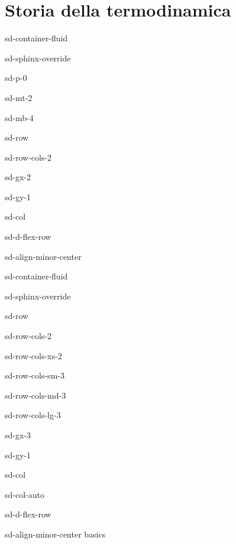 \documentclass[letterpaper,10pt,english]{jupyterBook}
\begin{document}
\chapter{Storia della termodinamica}
\label{\detokenize{ch/history:storia-della-termodinamica}}\label{\detokenize{ch/history:classical-thermodynamics-history}}\label{\detokenize{ch/history::doc}}


\sphinxstepscope

\begin{sphinxuseclass}{sd-container-fluid}
\begin{sphinxuseclass}{sd-sphinx-override}
\begin{sphinxuseclass}{sd-p-0}
\begin{sphinxuseclass}{sd-mt-2}
\begin{sphinxuseclass}{sd-mb-4}
\begin{sphinxuseclass}{sd-row}
\begin{sphinxuseclass}{sd-row-cols-2}
\begin{sphinxuseclass}{sd-gx-2}
\begin{sphinxuseclass}{sd-gy-1}
\begin{sphinxuseclass}{sd-col}
\begin{sphinxuseclass}{sd-d-flex-row}
\begin{sphinxuseclass}{sd-align-minor-center}
\begin{sphinxuseclass}{sd-container-fluid}
\begin{sphinxuseclass}{sd-sphinx-override}
\begin{sphinxuseclass}{sd-row}
\begin{sphinxuseclass}{sd-row-cols-2}
\begin{sphinxuseclass}{sd-row-cols-xs-2}
\begin{sphinxuseclass}{sd-row-cols-sm-3}
\begin{sphinxuseclass}{sd-row-cols-md-3}
\begin{sphinxuseclass}{sd-row-cols-lg-3}
\begin{sphinxuseclass}{sd-gx-3}
\begin{sphinxuseclass}{sd-gy-1}
\begin{sphinxuseclass}{sd-col}
\begin{sphinxuseclass}{sd-col-auto}
\begin{sphinxuseclass}{sd-d-flex-row}
\begin{sphinxuseclass}{sd-align-minor-center}
\sphinxAtStartPar
basics


\end{sphinxuseclass}
\end{sphinxuseclass}
\end{sphinxuseclass}
\end{sphinxuseclass}
\end{sphinxuseclass}
\end{sphinxuseclass}
\end{sphinxuseclass}
\end{sphinxuseclass}
\end{sphinxuseclass}
\end{sphinxuseclass}
\end{sphinxuseclass}
\end{sphinxuseclass}
\end{sphinxuseclass}
\end{sphinxuseclass}
\end{sphinxuseclass}
\end{sphinxuseclass}
\end{sphinxuseclass}
\end{sphinxuseclass}
\end{sphinxuseclass}
\end{sphinxuseclass}
\end{sphinxuseclass}
\end{sphinxuseclass}
\end{sphinxuseclass}
\end{sphinxuseclass}
\end{sphinxuseclass}
\end{sphinxuseclass}
\end{document}

